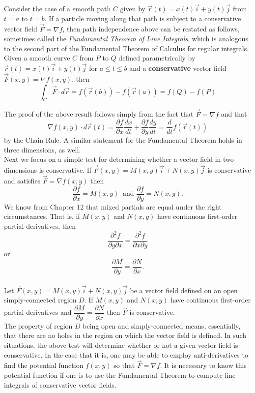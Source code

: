Consider the case of a smooth path $C$ given by $\vec r(t) = x(t) \vec i + y(t) \vec j$ from $t = a$ to $t = b$. If a particle moving along that path is subject to a conservative vector field $\vec F = \nabla f$, then path independence above can be restated as follows, sometimes called the \emph{Fundamental Theorem of Line Integrals}, which is analogous to the second part of the Fundamental Theorem of Calculus for regular integrals.\\

{Given a smooth curve $C$ from $P$ to $Q$ defined parametrically by $\vec r(t) = x(t) \vec i + y(t) \vec j$ for $a \leq t \leq b$ and a \textbf{conservative} vector field $\vec F(x,y) = \nabla f(x,y)$, then
$$\int_C \vec F \cdot d\vec r = f\left( \vec r(b) \right) - f\left( \vec r(a) \right) = f(Q) - f(P)$$
}

The proof of the above result follows simply from the fact that $\vec F = \nabla f$ and that 
$$\nabla f(x,y) \cdot d\vec r(t) = \dfrac{\partial f}{\partial x} \dfrac{dx}{dt} + \dfrac{\partial f}{\partial y} \dfrac{dy}{dt} = \dfrac{d}{dt} f\left( \vec r(t) \right)$$
by the Chain Rule.  A similar statement for the Fundamental Theorem holds in three dimensions, as well.\\

Next we focus on a simple test for determining whether a vector field in two dimensions is conservative.  If $\vec F(x,y) = M(x,y) \vec i + N(x,y) \vec j$ is conservative and satisfies $\vec F = \nabla f(x,y)$ then
$$\dfrac{\partial f}{\partial x} = M(x,y) \: \text{ and } \dfrac{\partial f}{\partial y} = N(x,y).$$
We know from Chapter 12 that mixed partials are equal under the right circumstances.  That is, if $M(x,y)$ and $N(x,y)$ have continuous  first-order partial derivatives, then
$$\dfrac{\partial^2 f}{\partial y \partial x} = \dfrac{\partial^2 f}{\partial x \partial y}$$
or
$$\dfrac{\partial M}{\partial y} = \dfrac{\partial N}{\partial x}.$$\\

{Let $\vec F(x,y) = M(x,y) \vec i + N(x,y) \vec j$ be a vector field defined on an open simply-connected region $D$.  If $M(x,y)$ and $N(x,y)$ have continuous first-order partial derivatives and $\dfrac{\partial M}{\partial y} = \dfrac{\partial N}{\partial x}$ then $\vec F$ is conservative.
}\\

The property of region $D$ being open and simply-connected means, essentially, that there are no holes in the region on which the vector field is defined. In such situations, the above test will determine whether or not a given vector field is conservative.  In the case that it is, one may be able to employ anti-derivatives to find the potential function $f(x,y)$ so that $\vec F = \nabla f$.  It is necessary to know this potential function if one is to use the Fundamental Theorem to compute line integrals of conservative vector fields.\\


